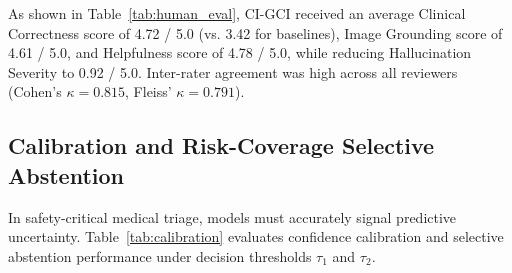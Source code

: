 \documentclass[journal,twoside,web]{ieeecolor}
\begin{document}
\begin{table}[t]
\caption{Blinded Human Evaluation by Radiologists}
\label{tab:human_eval}
\centering
\setlength{\tabcolsep}{3pt}
\end{table}

As shown in Table~\ref{tab:human_eval}, CI-GCI received an average Clinical Correctness score of 4.72 / 5.0 (vs. 3.42 for baselines), Image Grounding score of 4.61 / 5.0, and Helpfulness score of 4.78 / 5.0, while reducing Hallucination Severity to 0.92 / 5.0. Inter-rater agreement was high across all reviewers (Cohen's $\kappa = 0.815$, Fleiss' $\kappa = 0.791$).

\subsection{Calibration and Risk-Coverage Selective Abstention}
In safety-critical medical triage, models must accurately signal predictive uncertainty. Table~\ref{tab:calibration} evaluates confidence calibration and selective abstention performance under decision thresholds $\tau_1$ and $\tau_2$.

\begin{table}[t]
\caption{Calibration and Selective Abstention Performance}
\label{tab:calibration}
\centering
\setlength{\tabcolsep}{3pt}
\end{table}
\end{document}
